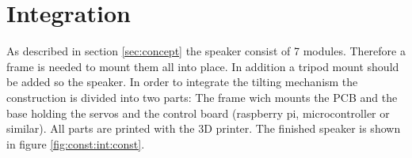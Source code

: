 \section{Integration}


As described in section \ref{sec:concept} the speaker consist of 7 modules. Therefore a frame is needed to mount them all into place. In addition a tripod mount should be added so the speaker. In order to integrate the tilting mechanism the construction is divided into two parts: The frame wich mounts the PCB and the base holding the servos and the control board (raspberry pi, microcontroller or similar). All parts are printed with the 3D printer. The finished speaker is shown in figure \ref{fig:const:int:const}.
%
